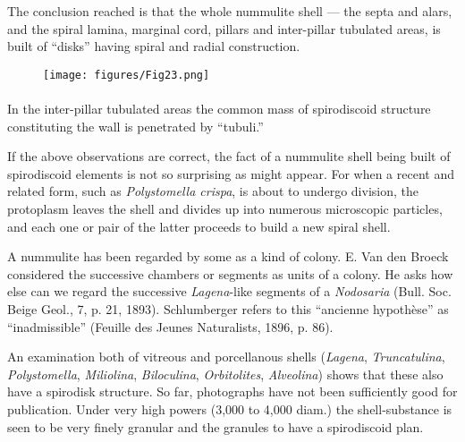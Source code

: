 \documentclass[a4paper, 12pt, oneside]{article}
\begin{document}
The conclusion reached is that the whole nummulite shell --- the septa and alars, and the spiral lamina, marginal cord, pillars and inter-pillar tubulated areas, is built of ``disks'' having spiral and radial construction.
\begin{figure}[H]
\centering
\texttt{[image: figures/Fig23.png]}
\caption*{}
\end{figure}
\paragraph{}
In the inter-pillar tubulated areas the common mass of spirodiscoid structure constituting the wall is penetrated by ``tubuli.''

If the above observations are correct, the fact of a nummulite shell being built of spirodiscoid elements is not so surprising as might appear. For when a recent and related form, such as \emph{Polystomella crispa}, is about to undergo division, the protoplasm leaves the shell and divides up into numerous microscopic particles, and each one or pair of the latter proceeds to build a new spiral shell.

A nummulite has been regarded by some as a kind of colony. E. Van den Broeck considered the successive chambers or segments as units of a colony. He asks how else can we regard the successive \emph{Lagena}-like segments of a \emph{Nodosaria} (Bull. Soc. Beige Geol., 7, p. 21, 1893). Schlumberger refers to this ``ancienne hypothèse'' as ``inadmissible'' (Feuille des Jeunes Naturalists, 1896, p. 86).

An examination both of vitreous and porcellanous shells (\emph{Lagena}, \emph{Truncatulina}, \emph{Polystomella}, \emph{Miliolina}, \emph{Biloculina}, \emph{Orbitolites}, \emph{Alveolina}) shows that these also have a spirodisk structure. So far, photographs have not been sufficiently good for publication. Under very high powers (3,000 to 4,000 diam.) the shell-substance is seen to be very finely granular and the granules to have a spirodiscoid plan.
\end{document}
